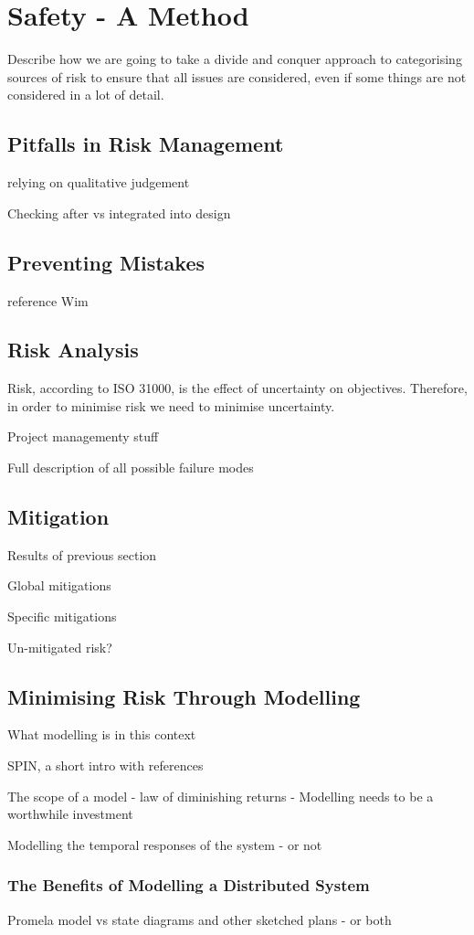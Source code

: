 \section{Safety - A Method}
Describe how we are going to take a divide and conquer approach to categorising 
sources of risk to ensure that all issues are considered, even if some things are not
considered in a lot of detail.
\subsection{Pitfalls in Risk Management}
relying on qualitative judgement

Checking after vs integrated into design

\subsection{Preventing Mistakes}
reference Wim

\subsection{Risk Analysis}
Risk, according to ISO 31000\cite{}, is the effect of uncertainty on objectives. 
Therefore, in order to minimise risk we need to minimise uncertainty.

Project managementy stuff

 Full description of all possible failure modes

\subsection{Mitigation}
Results of previous section

Global mitigations

Specific mitigations

Un-mitigated risk?

\subsection{Minimising Risk Through Modelling}
What modelling is in this context

SPIN, a short intro with references

The scope of a model - law of diminishing returns - Modelling needs to be a worthwhile investment

Modelling the temporal responses of the system - or not

\subsubsection{The Benefits of Modelling a Distributed System}
Promela model vs state diagrams and other sketched plans - or both

